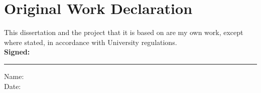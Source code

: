 \chapter*{Original Work Declaration}

This dissertation and the project that it is based on are my own work, except where stated, in accordance with University regulations.
\\ \newline
\textbf{Signed:}
\hrule width 0.5\textwidth
\vspace{6pt}
\noindent
Name: 
\\
Date:
\\